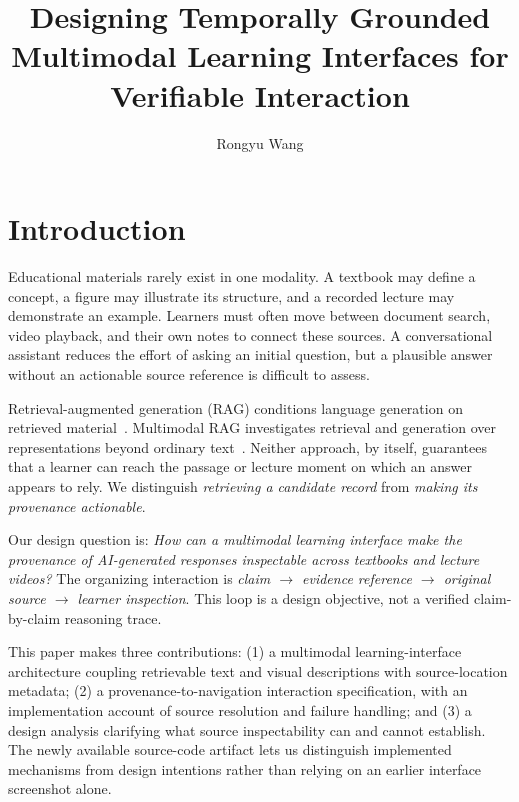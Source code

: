 \documentclass[manuscript,screen,nonacm]{acmart}
\title{Designing Temporally Grounded Multimodal Learning Interfaces for Verifiable Interaction}
\author{Rongyu Wang}
\affiliation{\institution{University of Reading}\city{Reading}\country{United Kingdom}}
\begin{document}
\maketitle
{}\par

\section{Introduction}
Educational materials rarely exist in one modality. A textbook may define a concept, a figure may illustrate its structure, and a recorded lecture may demonstrate an example. Learners must often move between document search, video playback, and their own notes to connect these sources. A conversational assistant reduces the effort of asking an initial question, but a plausible answer without an actionable source reference is difficult to assess.

Retrieval-augmented generation (RAG) conditions language generation on retrieved material~\cite{lewis2020rag}. Multimodal RAG investigates retrieval and generation over representations beyond ordinary text~\cite{hu2025mrag}. Neither approach, by itself, guarantees that a learner can reach the passage or lecture moment on which an answer appears to rely. We distinguish \emph{retrieving a candidate record} from \emph{making its provenance actionable}.

Our design question is: \emph{How can a multimodal learning interface make the provenance of AI-generated responses inspectable across textbooks and lecture videos?} The organizing interaction is \emph{claim $\rightarrow$ evidence reference $\rightarrow$ original source $\rightarrow$ learner inspection}. This loop is a design objective, not a verified claim-by-claim reasoning trace.

This paper makes three contributions: (1) a multimodal learning-interface architecture coupling retrievable text and visual descriptions with source-location metadata; (2) a provenance-to-navigation interaction specification, with an implementation account of source resolution and failure handling; and (3) a design analysis clarifying what source inspectability can and cannot establish. The newly available source-code artifact lets us distinguish implemented mechanisms from design intentions rather than relying on an earlier interface screenshot alone.
\end{document}
